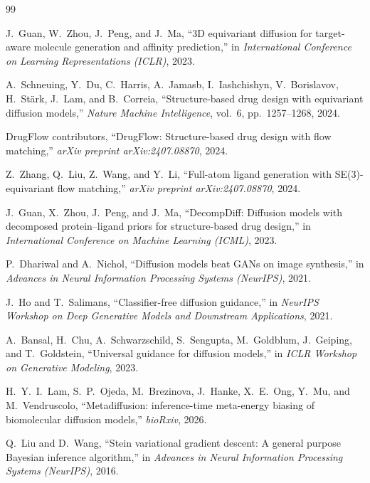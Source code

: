 \documentclass[a4paper,11pt]{article}
\begin{document}

\begin{thebibliography}{99}

J.~Guan, W.~Zhou, J.~Peng, and J.~Ma,
``3D equivariant diffusion for target-aware molecule generation and affinity
prediction,''
in \emph{International Conference on Learning Representations (ICLR)}, 2023.

A.~Schneuing, Y.~Du, C.~Harris, A.~Jamasb, I.~Iashchishyn, V.~Borislavov,
H.~St\"{a}rk, J.~Lam, and B.~Correia,
``Structure-based drug design with equivariant diffusion models,''
\emph{Nature Machine Intelligence}, vol.~6, pp.~1257--1268, 2024.

DrugFlow contributors,
``DrugFlow: Structure-based drug design with flow matching,''
\emph{arXiv preprint arXiv:2407.08870}, 2024.

Z.~Zhang, Q.~Liu, Z.~Wang, and Y.~Li,
``Full-atom ligand generation with SE(3)-equivariant flow matching,''
\emph{arXiv preprint arXiv:2407.08870}, 2024.

J.~Guan, X.~Zhou, J.~Peng, and J.~Ma,
``DecompDiff: Diffusion models with decomposed protein--ligand priors for
structure-based drug design,''
in \emph{International Conference on Machine Learning (ICML)}, 2023.

P.~Dhariwal and A.~Nichol,
``Diffusion models beat GANs on image synthesis,''
in \emph{Advances in Neural Information Processing Systems (NeurIPS)}, 2021.

J.~Ho and T.~Salimans,
``Classifier-free diffusion guidance,''
in \emph{NeurIPS Workshop on Deep Generative Models and Downstream Applications},
2021.

A.~Bansal, H.~Chu, A.~Schwarzschild, S.~Sengupta, M.~Goldblum, J.~Geiping,
and T.~Goldstein,
``Universal guidance for diffusion models,''
in \emph{ICLR Workshop on Generative Modeling}, 2023.

H.~Y.~I.~Lam, S.~P.~Ojeda, M.~Brezinova, J.~Hanke, X.~E.~Ong, Y.~Mu, and
M.~Vendruscolo,
``Metadiffusion: inference-time meta-energy biasing of biomolecular diffusion
models,''
\emph{bioRxiv}, 2026.

Q.~Liu and D.~Wang,
``Stein variational gradient descent: A general purpose Bayesian inference
algorithm,''
in \emph{Advances in Neural Information Processing Systems (NeurIPS)}, 2016.


\end{thebibliography}
\end{document}
